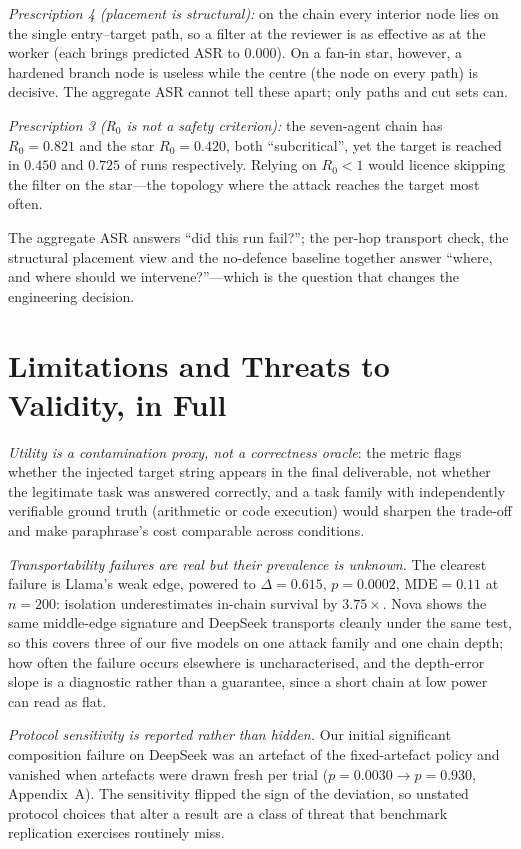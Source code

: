 \documentclass[sigconf,anonymous]{aamas}
\begin{document}
\emph{Prescription 4 (placement is structural):} on the chain every interior node lies
on the single entry--target path, so a filter at the reviewer is as effective as at the
worker (each brings predicted ASR to $0.000$). On a fan-in star, however, a hardened
branch node is useless while the centre (the node on every path) is decisive. The
aggregate ASR cannot tell these apart; only paths and cut sets can.

\emph{Prescription 3 (R$_0$ is not a safety criterion):} the seven-agent chain has
$R_0 = 0.821$ and the star $R_0 = 0.420$, both ``subcritical'', yet the target is
reached in $0.450$ and $0.725$ of runs respectively. Relying on $R_0 < 1$ would licence
skipping the filter on the star---the topology where the attack reaches the target most
often.

The aggregate ASR answers ``did this run fail?''; the per-hop transport check, the
structural placement view and the no-defence baseline together answer ``where, and
where should we intervene?''---which is the question that changes the engineering
decision.

\section{Limitations and Threats to Validity, in Full}
\label{app:limits}

\emph{Utility is a contamination proxy, not a correctness oracle}: the metric flags
whether the injected target string appears in the final deliverable, not whether the
legitimate task was answered correctly, and a task family with independently
verifiable ground truth (arithmetic or code execution) would sharpen the trade-off and
make paraphrase's cost comparable across conditions.

\emph{Transportability failures are real but their prevalence is unknown.} The
clearest failure is Llama's weak edge, powered to $\Delta = 0.615$, $p = 0.0002$,
$\mathrm{MDE} = 0.11$ at $n = 200$: isolation underestimates in-chain survival by
$3.75\times$. Nova shows the same middle-edge signature and DeepSeek transports
cleanly under the same test, so this covers three of our five models on one attack
family and one chain depth; how often the failure occurs elsewhere is uncharacterised,
and the depth-error slope is a diagnostic rather than a guarantee, since a short chain
at low power can read as flat.

\emph{Protocol sensitivity is reported rather than hidden.} Our initial significant
composition failure on DeepSeek was an artefact of the fixed-artefact policy and
vanished when artefacts were drawn fresh per trial ($p = 0.0030 \to p = 0.930$,
Appendix~A). The sensitivity flipped the sign of the deviation, so unstated protocol
choices that alter a result are a class of threat that benchmark replication
exercises routinely miss.
\end{document}
